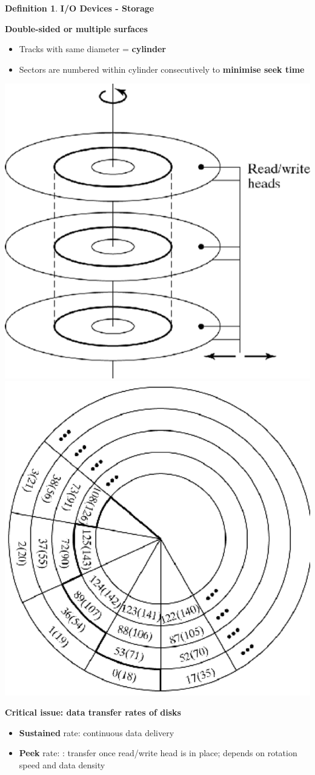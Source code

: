 \documentclass[11pt,a4paper]{article}
\theoremstyle{definition}
\newtheorem{definition}{Definition}[section]
\newenvironment{myitemize}
{ \begin{itemize}
    \setlength{\itemsep}{5pt}
    \setlength{\parskip}{0pt}
    \setlength{\parsep}{0pt}     }
{ \end{itemize}                  }
\begin{document}
\begin{definition}{\textbf{I/O Devices - Storage}}
	\begin{minipage}{0.3\linewidth}
		\textbf{Double-sided or multiple surfaces}
		\begin{myitemize}
			\item Tracks with same diameter = \textbf{cylinder}
			\item Sectors are numbered within cylinder consecutively to \textbf{minimise seek time}
		\end{myitemize}
	\end{minipage}
	\begin{minipage}{0.7\linewidth}
		\includegraphics[width=0.5\linewidth]{m3/diskTrackView5}
		\includegraphics[width=0.5\linewidth]{m3/diskTrackView6}
	\end{minipage}
	
	\textbf{Critical issue: data transfer rates of disks}
	\begin{myitemize}
		\item \textbf{Sustained} rate: continuous data delivery
		\item \textbf{Peek} rate: : transfer once read/write head is in place; depends on rotation speed and data density
	\end{myitemize}
\end{definition}
\end{document}
